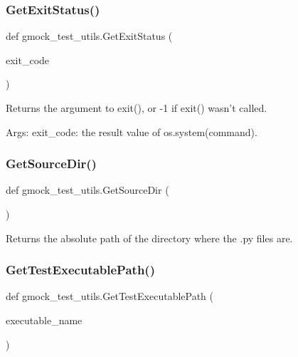 \subsubsection{\texorpdfstring{GetExitStatus()}{GetExitStatus()}}
{\footnotesize\ttfamily def gmock\+\_\+test\+\_\+utils.\+Get\+Exit\+Status (\begin{DoxyParamCaption}\item[{}]{exit\+\_\+code }\end{DoxyParamCaption})}

\begin{DoxyVerb}Returns the argument to exit(), or -1 if exit() wasn't called.

Args:
  exit_code: the result value of os.system(command).
\end{DoxyVerb}
 \mbox{\label{namespacegmock__test__utils_ab7217591e655e80392c9db6b99d04765}} 
\subsubsection{\texorpdfstring{GetSourceDir()}{GetSourceDir()}}
{\footnotesize\ttfamily def gmock\+\_\+test\+\_\+utils.\+Get\+Source\+Dir (\begin{DoxyParamCaption}{ }\end{DoxyParamCaption})}

\begin{DoxyVerb}Returns the absolute path of the directory where the .py files are.\end{DoxyVerb}
 \mbox{\label{namespacegmock__test__utils_aadd2927024e24f0c53f7ba283402cdb1}} 
\subsubsection{\texorpdfstring{GetTestExecutablePath()}{GetTestExecutablePath()}}
{\footnotesize\ttfamily def gmock\+\_\+test\+\_\+utils.\+Get\+Test\+Executable\+Path (\begin{DoxyParamCaption}\item[{}]{executable\+\_\+name }\end{DoxyParamCaption})}

